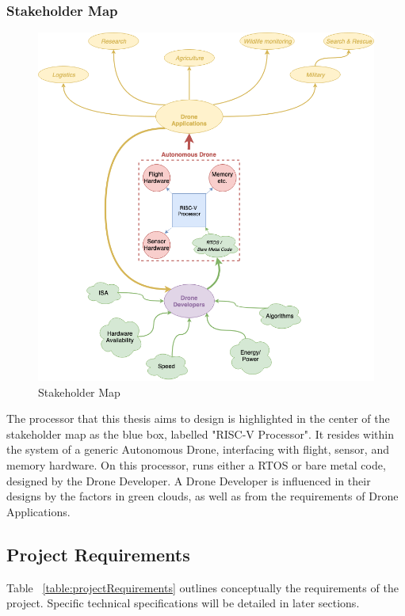 \documentclass[11pt, oneside]{article}      %
\begin{document}
\subsubsection{Stakeholder Map} 
\begin{figure}[!htbp]
\begin{centering}
\includegraphics[width=\linewidth]{img/stakeholderMap.png}
\caption{Stakeholder Map}
\label{fig:stakeholderMap}
\end{centering}
\end{figure}


The processor that this thesis aims to design is highlighted in the center of the stakeholder map as the blue box, labelled "RISC-V Processor". It resides within the system of a generic Autonomous Drone, interfacing with flight, sensor, and memory hardware. On this processor, runs either a \ac{RTOS} or bare metal code, designed by the Drone Developer. A Drone Developer is influenced in their designs by the factors in green clouds, as well as from the requirements of Drone Applications.


\subsection{Project Requirements} \label{subsection:projectRequirements}
Table ~\ref{table:projectRequirements} outlines conceptually the requirements of the project. Specific technical specifications will be detailed in later sections. 
\end{document}
